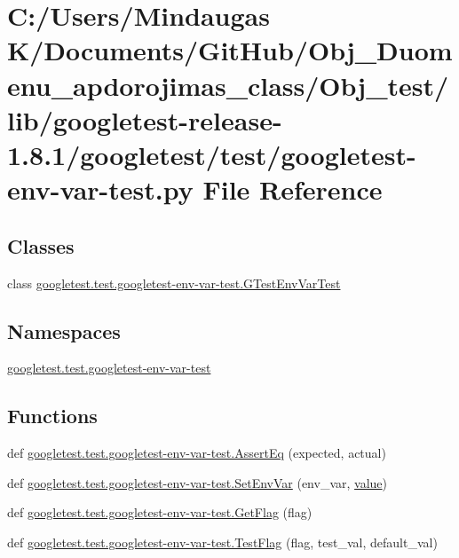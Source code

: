 \hypertarget{_obj__test_2lib_2googletest-release-1_88_81_2googletest_2test_2googletest-env-var-test_8py}{}\section{C\+:/\+Users/\+Mindaugas K/\+Documents/\+Git\+Hub/\+Obj\+\_\+\+Duomenu\+\_\+apdorojimas\+\_\+class/\+Obj\+\_\+test/lib/googletest-\/release-\/1.8.1/googletest/test/googletest-\/env-\/var-\/test.py File Reference}
\label{_obj__test_2lib_2googletest-release-1_88_81_2googletest_2test_2googletest-env-var-test_8py}
\subsection*{Classes}
\begin{DoxyCompactItemize}
\item 
class \mbox{\hyperlink{classgoogletest_1_1test_1_1googletest-env-var-test_1_1_g_test_env_var_test}{googletest.\+test.\+googletest-\/env-\/var-\/test.\+G\+Test\+Env\+Var\+Test}}
\end{DoxyCompactItemize}
\subsection*{Namespaces}
\begin{DoxyCompactItemize}
\item 
 \mbox{\hyperlink{namespacegoogletest_1_1test_1_1googletest-env-var-test}{googletest.\+test.\+googletest-\/env-\/var-\/test}}
\end{DoxyCompactItemize}
\subsection*{Functions}
\begin{DoxyCompactItemize}
\item 
def \mbox{\hyperlink{namespacegoogletest_1_1test_1_1googletest-env-var-test_aff12ee67219f21b80f07df97cc307fc9}{googletest.\+test.\+googletest-\/env-\/var-\/test.\+Assert\+Eq}} (expected, actual)
\item 
def \mbox{\hyperlink{namespacegoogletest_1_1test_1_1googletest-env-var-test_ae1f6f06e8deee945363c503c36be2bda}{googletest.\+test.\+googletest-\/env-\/var-\/test.\+Set\+Env\+Var}} (env\+\_\+var, \mbox{\hyperlink{_obj__test_2lib_2googletest-master_2googlemock_2test_2gmock-matchers__test_8cc_a337b8a670efc0b086ad3af163f3121b6}{value}})
\item 
def \mbox{\hyperlink{namespacegoogletest_1_1test_1_1googletest-env-var-test_abbfc988143774ad9606da3f707f140eb}{googletest.\+test.\+googletest-\/env-\/var-\/test.\+Get\+Flag}} (flag)
\item 
def \mbox{\hyperlink{namespacegoogletest_1_1test_1_1googletest-env-var-test_a191e7254c4271f145f0806856fbfbf5b}{googletest.\+test.\+googletest-\/env-\/var-\/test.\+Test\+Flag}} (flag, test\+\_\+val, default\+\_\+val)
\end{DoxyCompactItemize}
